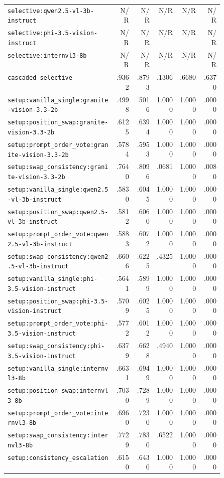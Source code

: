 \documentclass[10pt]{article}
\DeclareRobustCommand{\method}[1]{\nolinkurl{#1}}
\begin{document}
\begin{longtable}{@{}L{0.50\linewidth}rrrrr@{}}
\method{selective:qwen2.5-vl-3b-instruct} & N/R & N/R & N/R & N/R & N/R \\
\method{selective:phi-3.5-vision-instruct} & N/R & N/R & N/R & N/R & N/R \\
\method{selective:internvl3-8b} & N/R & N/R & N/R & N/R & N/R \\
\method{cascaded_selective} & .9362 & .8793 & .1306 & .6680 & .6370 \\
\method{setup:vanilla_single:granite-vision-3.3-2b} & .4998 & .5016 & 1.0000 & 1.0000 & .0000 \\
\method{setup:position_swap:granite-vision-3.3-2b} & .6125 & .6394 & 1.0000 & 1.0000 & .0000 \\
\method{setup:prompt_order_vote:granite-vision-3.3-2b} & .5784 & .5953 & 1.0000 & 1.0000 & .0000 \\
\method{setup:swap_consistency:granite-vision-3.3-2b} & .7640 & .8096 & .0681 & 1.0000 & .0080 \\
\method{setup:vanilla_single:qwen2.5-vl-3b-instruct} & .5830 & .6045 & 1.0000 & 1.0000 & .0000 \\
\method{setup:position_swap:qwen2.5-vl-3b-instruct} & .5812 & .6060 & 1.0000 & 1.0000 & .0000 \\
\method{setup:prompt_order_vote:qwen2.5-vl-3b-instruct} & .5883 & .6072 & 1.0000 & 1.0000 & .0000 \\
\method{setup:swap_consistency:qwen2.5-vl-3b-instruct} & .6606 & .6225 & .4325 & 1.0000 & .0000 \\
\method{setup:vanilla_single:phi-3.5-vision-instruct} & .5641 & .5899 & 1.0000 & 1.0000 & .0000 \\
\method{setup:position_swap:phi-3.5-vision-instruct} & .5709 & .6025 & 1.0000 & 1.0000 & .0000 \\
\method{setup:prompt_order_vote:phi-3.5-vision-instruct} & .5772 & .6012 & 1.0000 & 1.0000 & .0000 \\
\method{setup:swap_consistency:phi-3.5-vision-instruct} & .6379 & .6628 & .4940 & 1.0000 & .0000 \\
\method{setup:vanilla_single:internvl3-8b} & .6631 & .6949 & 1.0000 & 1.0000 & .0000 \\
\method{setup:position_swap:internvl3-8b} & .7030 & .7289 & 1.0000 & 1.0000 & .0000 \\
\method{setup:prompt_order_vote:internvl3-8b} & .6960 & .7230 & 1.0000 & 1.0000 & .0000 \\
\method{setup:swap_consistency:internvl3-8b} & .7729 & .7830 & .6522 & 1.0000 & .0000 \\
\method{setup:consistency_escalation} & .6150 & .6430 & 1.0000 & 1.0000 & .0000 \\
\bottomrule
\end{longtable}
\normalsize
\end{document}

